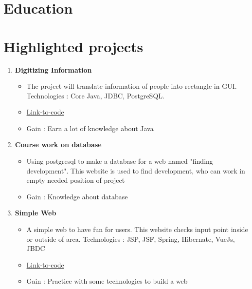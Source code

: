 \documentclass[12pt,a4paper,sans]{moderncv}        %
\begin{document}
\makecvtitle

\section{Education}

\section{Highlighted projects}
\begin{enumerate}
    \item \textbf{Digitizing Information}
    \begin{itemize}
        \item The project will translate information of people into rectangle in GUI. Technologies : Core Java, JDBC, PostgreSQL. 
        \item \href{https://github.com/0123456hahaha0123456/Digitizing-information}{Link-to-code}
        \item Gain : Earn a lot of knowledge about Java
    \end{itemize}

    \item \textbf{Course work on database}
    \begin{itemize}
        \item Using postgresql to make a database for a web named "finding development". This website is used to find development, who can work in empty needed position of project
        \item Gain : Knowledge about database
    \end{itemize}

    \item \textbf{Simple Web}
    \begin{itemize}
        \item A simple web to have fun for users. This website checks input point inside or outside of area. Technologies : JSP, JSF, Spring, Hibernate, VueJs, JBDC
        \item \href{https://github.com/0123456hahaha0123456/PIP}{Link-to-code}
        \item Gain : Practice with some technologies to build a web 
    \end{itemize}
\end{enumerate}
\end{document}
